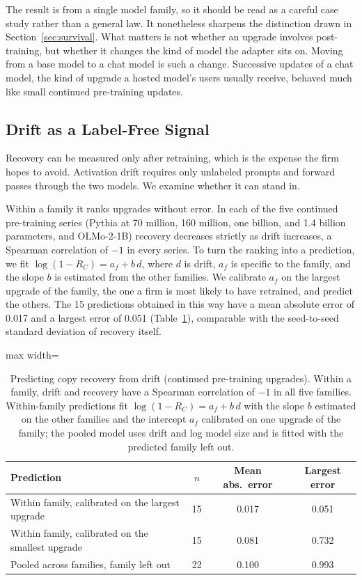 \documentclass[preprint,12pt,authoryear]{elsarticle}
\begin{document}
The result is from a single model family, so it should be read as a careful case study rather than a general law. It nonetheless sharpens the distinction drawn in Section~\ref{sec:survival}. What matters is not whether an upgrade involves post-training, but whether it changes the kind of model the adapter sits on. Moving from a base model to a chat model is such a change. Successive updates of a chat model, the kind of upgrade a hosted model's users usually receive, behaved much like small continued pre-training updates.

\subsection{Drift as a Label-Free Signal}\label{sec:drift}

Recovery can be measured only after retraining, which is the expense the firm hopes to avoid. Activation drift requires only unlabeled prompts and forward passes through the two models. We examine whether it can stand in.

Within a family it ranks upgrades without error. In each of the five continued pre-training series (Pythia at 70 million, 160 million, one billion, and 1.4 billion parameters, and OLMo-2-1B) recovery decreases strictly as drift increases, a Spearman correlation of $-1$ in every series. To turn the ranking into a prediction, we fit $\log(1-R_C)=a_f+b\,d$, where $d$ is drift, $a_f$ is specific to the family, and the slope $b$ is estimated from the other families. We calibrate $a_f$ on the largest upgrade of the family, the one a firm is most likely to have retrained, and predict the others. The 15 predictions obtained in this way have a mean absolute error of 0.017 and a largest error of 0.051 (Table~\ref{tab:drift}), comparable with the seed-to-seed standard deviation of recovery itself.

\begin{table}[t]
\centering
\caption{Predicting copy recovery from drift (continued pre-training upgrades). Within a family, drift and recovery have a Spearman correlation of $-1$ in all five families. Within-family predictions fit $\log(1-R_C)=a_f+b\,d$ with the slope $b$ estimated on the other families and the intercept $a_f$ calibrated on one upgrade of the family; the pooled model uses drift and log model size and is fitted with the predicted family left out.}\label{tab:drift}
\small
\begin{adjustbox}{max width=\textwidth}
\begin{tabular}{lccc}
\toprule
Prediction & $n$ & Mean abs.\ error & Largest error\\
\midrule
Within family, calibrated on the largest upgrade & 15 & 0.017 & 0.051\\
Within family, calibrated on the smallest upgrade & 15 & 0.081 & 0.732\\
Pooled across families, family left out & 22 & 0.100 & 0.993\\
\bottomrule
\end{tabular}
\end{adjustbox}
\end{table}
\end{document}

